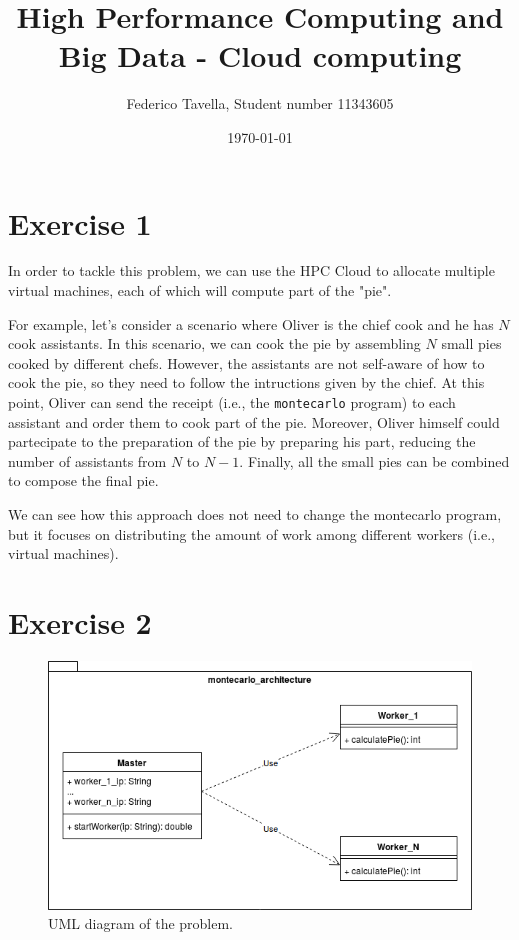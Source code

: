 \documentclass[a4paper]{article}
\title{High Performance Computing and Big Data - Cloud computing}
\author{Federico Tavella, Student number 11343605}
\date{\today}
\begin{document}
\maketitle

\section{Exercise 1}


In order to tackle this problem, we can use the HPC Cloud to allocate multiple virtual machines, each of which will compute part of the "pie".

For example, let's consider a scenario where Oliver is the chief cook and he has $N$ cook assistants. In this scenario, we can cook the pie by assembling $N$ small pies cooked by different chefs. However, the assistants are not self-aware of how to cook the pie, so they need to follow the intructions given by the chief. At this point, Oliver can send the receipt (i.e., the \texttt{montecarlo} program) to each assistant and order them to cook part of the pie. Moreover, Oliver himself could partecipate to the preparation of the pie by preparing his part, reducing the number of assistants from $N$ to $N-1$. Finally, all the small pies can be combined to compose the final pie.

We can see how this approach does not need to change the montecarlo program, but it focuses on distributing the amount of work among different workers (i.e., virtual machines).

\section{Exercise 2}


\begin{figure}[htbp]
\centering
\includegraphics[width=\textwidth]{res/montecarlo.png}
\caption{UML diagram of the problem.}
\label{fig:montecarlo}
\end{figure}
\end{document}
